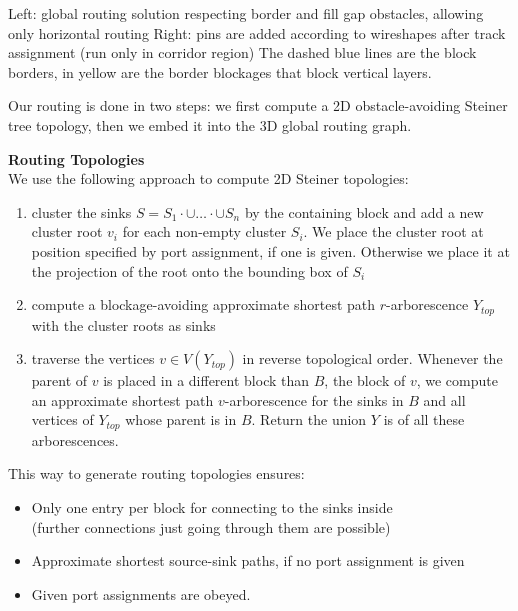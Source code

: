 \documentclass[a2paper]{bigsposter}
\begin{document}
\begin{blockrow}[3]
\begin{tikzpicture}[yscale=0.7]
 		\end{tikzpicture} 
 {\tiny \begin{spacing}{0.9}
 		Left: global routing solution respecting border and fill gap obstacles, allowing only horizontal routing
 		Right: pins are added according to wireshapes after track assignment (run only in corridor region)
 		The dashed blue lines are the block borders, in yellow are the border blockages that block vertical layers.
 	\end{spacing}	}
 
	Our routing is done in two steps: we first compute a 2D obstacle-avoiding Steiner tree topology, then we  embed it into the 3D global routing graph.

	\blockbreak
	\textbf{Routing Topologies}\\
	We use the following approach to compute 2D Steiner topologies:
	\begin{enumerate}
		\item cluster the sinks $S = S_1\cdot{\cup}\dots\cdot{\cup} S_n$ by the containing block and add a new cluster root $v_i$ for each non-empty cluster $S_i $.
		We place the cluster root at position specified by port assignment, if one is given. Otherwise we place it at the projection of the root onto the bounding box of $S_i$
	
	\item compute a  blockage-avoiding approximate shortest path $r$-arborescence $Y_{top}$ with the cluster roots as sinks
	\item traverse the vertices $v\in V(Y_{top})$ in reverse topological order.	
	Whenever the parent of $v$ is placed in a different block than $B$, the block of $v$, we compute an approximate shortest path $v$-arborescence for the  sinks in $B$ and all vertices of $Y_{top}$ whose parent is in $B$.
	Return the union $Y$ is of all these arborescences.
	\end{enumerate}
	
	This way to generate routing topologies ensures:
	\begin{itemize}
		\item Only one entry per block for connecting to the sinks inside \\
		(further connections just going through them are possible)
		\item Approximate shortest source-sink paths, if no port assignment is given
		\item Given port assignments are obeyed.
	\end{itemize}


\end{blockrow}
\end{document}
